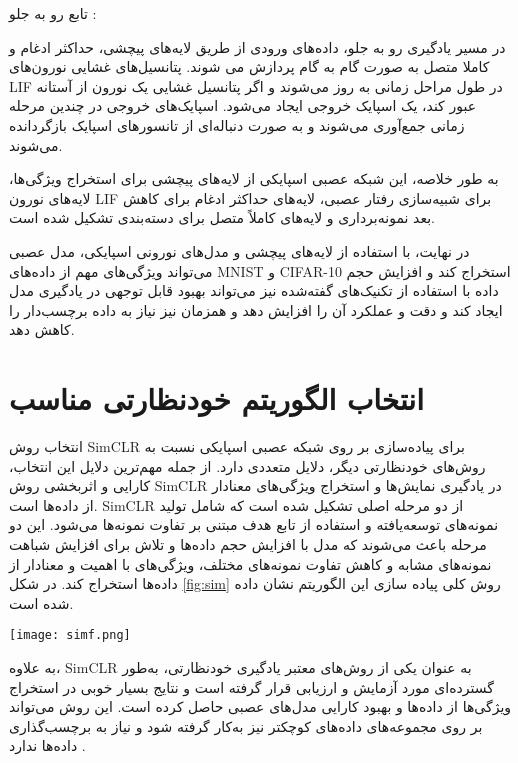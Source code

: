 تابع رو به جلو :

در مسیر یادگیری رو به جلو، داده‌های ورودی از طریق لایه‌های پیچشی، حداکثر ادغام و کاملا متصل به صورت گام به گام پردازش می شوند. پتانسیل‌های غشایی نورون‌های LIF در طول مراحل زمانی به روز می‌شوند و اگر پتانسیل غشایی یک نورون از آستانه عبور کند، یک اسپایک خروجی ایجاد می‌شود. اسپایک‌های خروجی در چندین مرحله زمانی جمع‌آوری می‌شوند و به صورت دنباله‌ای از تانسورهای اسپایک بازگردانده می‌شوند.

به طور خلاصه، این شبکه عصبی اسپایکی از لایه‌های پیچشی برای استخراج ویژگی‌ها، لایه‌های نورون LIF برای شبیه‌سازی رفتار عصبی، لایه‌های حداکثر ادغام برای کاهش بعد نمونه‌برداری  و لایه‌های کاملاً متصل برای دسته‌بندی تشکیل شده است. 


در نهایت، با استفاده از لایه‌های پیچشی و مدل‌های نورونی اسپایکی، مدل عصبی می‌تواند ویژگی‌های مهم از داده‌های MNIST و CIFAR-10 استخراج کند و افزایش حجم داده با استفاده از تکنیک‌های گفته‌شده نیز می‌تواند بهبود قابل توجهی در یادگیری مدل ایجاد کند و دقت و عملکرد آن را افزایش دهد و همزمان نیز نیاز به داده برچسب‌دار را کاهش دهد.


\section{انتخاب الگوریتم خودنظارتی مناسب}


انتخاب روش SimCLR برای پیاده‌سازی بر روی شبکه عصبی اسپایکی نسبت به روش‌های خودنظارتی دیگر، دلایل متعددی دارد. از جمله مهم‌ترین دلایل این انتخاب، کارایی و اثربخشی روش SimCLR در یادگیری نمایش‌ها و استخراج ویژگی‌های معنادار از داده‌ها است. SimCLR از دو مرحله اصلی تشکیل شده است که شامل تولید نمونه‌های توسعه‌یافته و استفاده از تابع هدف مبتنی بر تفاوت نمونه‌ها می‌شود. این دو مرحله باعث می‌شوند که مدل با افزایش حجم داده‌ها و تلاش برای افزایش شباهت نمونه‌های مشابه و کاهش تفاوت نمونه‌های مختلف، ویژگی‌های با اهمیت و معنادار از داده‌ها استخراج کند.
در شکل \ref{fig:sim} روش کلی پیاده سازی این الگوریتم نشان داده شده است.

\begin{minipage}{\linewidth}
	\centering
	\texttt{[image: simf.png]}
	\captionsetup{font=small} %
	\label{fig:sim}
\end{minipage}


به علاوه، SimCLR به عنوان یکی از روش‌های معتبر یادگیری خودنظارتی، به‌طور گسترده‌ای مورد آزمایش و ارزیابی قرار گرفته است و نتایج بسیار خوبی در استخراج ویژگی‌ها از داده‌ها و بهبود کارایی مدل‌های عصبی حاصل کرده است. این روش می‌تواند بر روی مجموعه‌های داده‌های کوچکتر نیز به‌کار گرفته شود و نیاز به برچسب‌گذاری داده‌ها ندارد .

